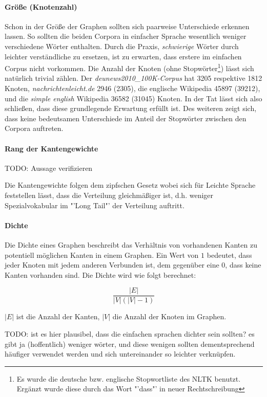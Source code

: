 \documentclass[12pt, a4paper]{article}
\begin{document}
\paragraph{Gr\"o\ss{}e (Knotenzahl)}

Schon in der Größe der Graphen sollten sich paarweise Unterschiede erkennen
lassen. So sollten die beiden Corpora in einfacher Sprache wesentlich weniger
verschiedene Wörter enthalten. Durch die Praxis, \emph{schwierige} Wörter
durch leichter verständliche zu ersetzen, ist zu erwarten, dass erstere im einfachen
Corpus nicht vorkommen. Die Anzahl der Knoten (ohne Stopw\"orter\footnote{Es wurde
die deutsche bzw. englische Stopwortliste des NLTK benutzt. Erg\"anzt wurde
diese durch das Wort "'dass"' in neuer Rechtschreibung}) lässt sich natürlich
trivial zählen. Der \emph{deunews2010\_100K-Corpus} hat 3205 respektive 1812
Knoten, \emph{nachrichtenleicht.de} 2946 (2305), die englische Wikipedia 45897
(39212), und die \emph{simple english} Wikipedia 36582 (31045) Knoten. In der
Tat l\"asst sich also schlie\ss{}en, dass diese grundlegende Erwartung
erf\"ullt ist. Des weiteren zeigt sich, dass keine bedeutsamen Unterschiede im
Anteil der Stopw\"orter zwischen den Corpora auftreten.

\paragraph{Rang der Kantengewichte}

TODO: Aussage verifizieren

Die Kantengewichte folgen dem zipfschen Gesetz wobei sich f\"ur Leichte Sprache
feststellen l\"asst, dass die Verteilung gleichm\"a\ss{}iger ist, d.h. weniger
Spezialvokabular im "'Long Tail"' der Verteilung auftritt.

\paragraph{Dichte}

Die Dichte eines Graphen beschreibt das Verhältnis von vorhandenen Kanten zu
potentiell möglichen Kanten in einem Graphen. Ein Wert von $1$ bedeutet, dass
jeder Knoten mit jedem anderen Verbunden ist, dem gegenüber eine $0$, dass keine
Kanten vorhanden sind. Die Dichte wird wie folgt berechnet:

$$
    \frac{|E|}{|V|(|V|-1)}
$$

$|E|$ ist die Anzahl der Kanten, $|V|$ die Anzahl der Knoten im Graphen. 

TODO: ist es hier plausibel, dass die einfachen sprachen dichter sein sollten?
es gibt ja (hoffentlich) weniger wörter, und diese wenigen sollten
dementsprechend häufiger verwendet werden und sich untereinander so leichter
verknüpfen.
\end{document}

